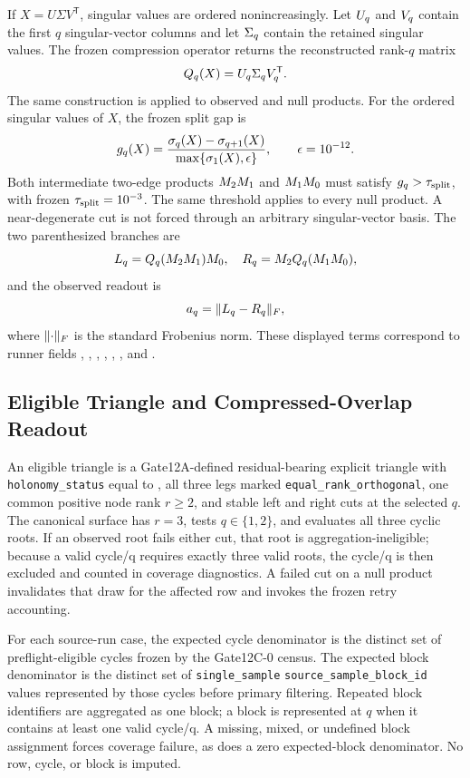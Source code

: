 \documentclass[11pt]{article}
\newcommand{\code}[1]{\texttt{\detokenize{#1}}}
\newcommand{\breakcode}[1]{\begingroup\urlstyle{tt}\nolinkurl{#1}\endgroup}
\begin{document}
If \(X=U\Sigma V^{\mathsf T}\), singular values are ordered
nonincreasingly. Let \(U\sb q\) and \(V\sb q\) contain the first \(q\)
singular-vector columns and let \(\Sigma\sb q\) contain the retained singular
values. The frozen compression operator returns the reconstructed rank-\(q\)
matrix
\[
Q\sb q(X)=U\sb q\Sigma\sb q V\sb q^{\mathsf T}.
\]
The same construction is applied to observed and null products. For the
ordered singular values of \(X\), the frozen split gap is
\[
g\sb q(X)=
\frac{\sigma\sb q(X)-\sigma\sb{q+1}(X)}
{\max\{\sigma\sb 1(X),\epsilon\}},
\qquad \epsilon=10^{-12}.
\]
Both intermediate two-edge products \(M\sb 2M\sb 1\) and
\(M\sb 1M\sb 0\) must satisfy
\(g\sb q>\tau\sb{\mathrm{split}}\), with frozen
\(\tau\sb{\mathrm{split}}=10^{-3}\). The same threshold applies to every
null product. A near-degenerate cut is not forced through an arbitrary
singular-vector basis. The two parenthesized branches are
\[
L\sb{q}=Q\sb{q}(M\sb{2}M\sb{1})M\sb{0},\quad
R\sb{q}=M\sb{2}Q\sb{q}(M\sb{1}M\sb{0}),
\]
and the observed readout is
\[
a\sb{q}=\lVert L\sb{q}-R\sb{q}\rVert\sb{F},
\]
where \(\lVert\cdot\rVert\sb F\) is the standard Frobenius norm.
These displayed terms correspond to runner fields \code{M0}, \code{M1},
\code{M2}, \code{Q_q}, \code{L_q}, \code{R_q}, and \code{a_q}.

\subsection{Eligible Triangle and Compressed-Overlap Readout}

An eligible triangle is a Gate12A-defined residual-bearing explicit triangle
with \breakcode{holonomy_status} equal to \code{defined}, all three legs marked
\breakcode{equal_rank_orthogonal}, one common positive node rank \(r\geq 2\), and
stable left and right cuts at the selected \(q\). The canonical surface has
\(r=3\), tests \(q\in\{1,2\}\), and evaluates all three cyclic roots. If an
observed root fails either cut, that root is aggregation-ineligible; because a
valid cycle/q requires exactly three valid roots, the cycle/q is then excluded
and counted in coverage diagnostics. A failed cut on a null product invalidates
that draw for the affected row and invokes the frozen retry accounting.

For each source-run case, the expected cycle denominator is the distinct set of
preflight-eligible cycles frozen by the Gate12C-0 census. The expected block
denominator is the distinct set of \breakcode{single_sample}
\breakcode{source_sample_block_id} values represented by those cycles before
primary filtering. Repeated block identifiers are aggregated as one block; a
block is represented at \(q\) when it contains at least one valid cycle/q. A
missing, mixed, or undefined block assignment forces coverage failure, as does
a zero expected-block denominator. No row, cycle, or block is imputed.
\end{document}
